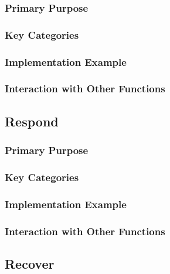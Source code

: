 \subsubsection{Primary Purpose}

\subsubsection{Key Categories}



\subsubsection{Implementation Example}

\subsubsection{Interaction with Other Functions}


\subsection{Respond}

\subsubsection{Primary Purpose}

\subsubsection{Key Categories}



\subsubsection{Implementation Example}

\subsubsection{Interaction with Other Functions}


\subsection{Recover}

